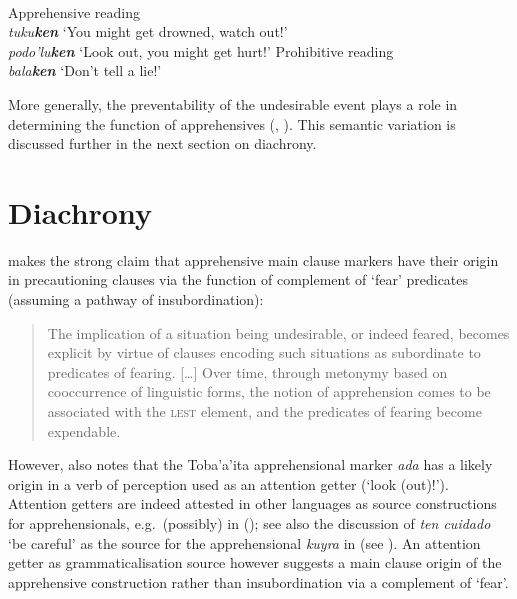 \documentclass[output=paper,colorlinks,citecolor=brown]{langscibook}
\begin{document}
\ea \label{ex:intro23} 
\\
\ea \label{ex:intro23a} \textnormal{Apprehensive reading} \\
\textit{tuku\textbf{ken}}  \textnormal{`You might get drowned, watch out!'}\\
\textit{podo'lu\textbf{ken}}  \textnormal{`Look out, you might get hurt!'}
\ex \label{ex:intro23b} \textnormal{Prohibitive reading}\\
\textit{bala\textbf{ken}} \textnormal{`Don't tell a lie!'}
\z
\z


\noindent More generally, the preventability of the undesirable event plays a role in determining the function of apprehensives (\citealt{chapters/fedotov}, \citealt{chapters/vuillermet}). This semantic variation is discussed further in the next section on diachrony.



\section{Diachrony}
\label{sec:diachrony}

\citet{lichtenberk1995} makes the strong claim that apprehensive main clause markers have their origin in precautioning clauses via the function of complement of `fear' predicates (assuming a pathway of insubordination):

\begin{quote}
    The implication of a situation being undesirable, or indeed feared, becomes explicit by virtue of clauses encoding such situations as subordinate to predicates of fearing. [\ldots] Over time, through metonymy based on cooccurrence of linguistic forms, the notion of apprehension comes to be associated with the \textsc{lest} element, and the predicates of fearing become expendable. \citep[319]{lichtenberk1995}
\end{quote}

 However, \citet[303]{lichtenberk1995} also notes that the Toba'a'ita apprehensional marker \textit{ada} has a likely origin in a verb of perception used as an attention getter (`look (out)!'). Attention getters are indeed attested in other languages as source constructions for apprehensionals, e.g.\ (possibly) in  (\citealt{chapters/daniel}); see also the discussion of  \textit{ten cuidado} `be careful' as the source for the apprehensional \textit{kuyra} in  (see ). An attention getter as grammaticalisation source however suggests a main clause origin of the apprehensive construction rather than insubordination via a complement of `fear'. 
\end{document}
